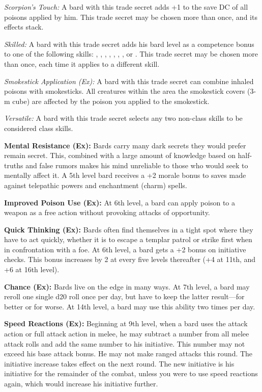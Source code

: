 \textit{Scorpion's Touch:} A bard with this trade secret adds +1 to the save DC of all poisons applied by him. This trade secret may be chosen more than once, and its effects stack.

\textit{Skilled:} A bard with this trade secret adds \onequarter his bard level as a competence bonus to one of the following skills: , , , , , , ,  or . This trade secret may be chosen more than once, each time it applies to a different skill.

\textit{Smokestick Application (Ex):} A bard with this trade secret can combine inhaled poisons with smokesticks. All creatures within the area the smokestick covers (3-m cube) are affected by the poison you applied to the smokestick.

\textit{Versatile:} A bard with this trade secret selects any two non-class skills to be considered class skills.


\textbf{Mental Resistance (Ex):} Bards carry many dark secrets they would prefer remain secret. This, combined with a large amount of knowledge based on half-truths and false rumors makes his mind unreliable to those who would seek to mentally affect it. A 5th level bard receives a +2 morale bonus to saves made against telepathic powers and enchantment (charm) spells.

\textbf{Improved Poison Use (Ex):} At 6th level, a bard can apply poison to a weapon as a free action without provoking attacks of opportunity.

\textbf{Quick Thinking (Ex):} Bards often find themselves in a tight spot where they have to act quickly, whether it is to escape a templar patrol or strike first when in confrontation with a foe. At 6th level, a bard gets a +2 bonus on initiative checks. This bonus increases by 2 at every five levels thereafter (+4 at 11th, and +6 at 16th level).

\textbf{Chance (Ex):} Bards live on the edge in many ways. At 7th level, a bard may reroll one single d20 roll once per day, but have to keep the latter result---for better or for worse. At 14th level, a bard may use this ability two times per day.

\textbf{Speed Reactions (Ex):} Beginning at 9th level, when a bard uses the attack action or full attack action in melee, he may subtract a number from all melee attack rolls and add the same number to his initiative. This number may not exceed his base attack bonus. He may not make ranged attacks this round. The initiative increase takes effect on the next round. The new initiative is his initiative for the remainder of the combat, unless you were to use speed reactions again, which would increase his initiative further.

